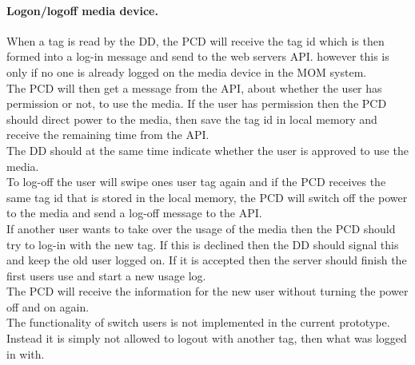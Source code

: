 	
\paragraph{Logon/logoff media device.} \newline
\label{Logonlogoffmedia}
When a tag is read by the DD, the PCD will receive the tag id which is then formed into a log-in message and send to the web servers API. however this is only if no one is already logged on the media device in the MOM system.\\
The PCD will then get a message from the API, about whether the user has permission or not, to use the media. If the user has permission then the PCD should direct power to the media, then save the tag id in local memory and receive the remaining time from the API.\\
The DD should at the same time indicate whether the user is approved to use the media.\\

To log-off the user will swipe ones user tag again and if the PCD receives the same tag id that is stored in the local memory, the PCD will switch off the power to the media and send a log-off message to the API. \\
If another user wants to take over the usage of the media then the PCD should try to log-in with the new tag. If this is declined then the DD should signal this and keep the old user logged on. If it is accepted then the server should finish the first users use and start a new usage log.\\
The PCD will receive the information for the new user without turning the power off and on again.\\
The functionality of switch users is not implemented in the current prototype. Instead it is simply not allowed to logout with another tag, then what was logged in with.\\

